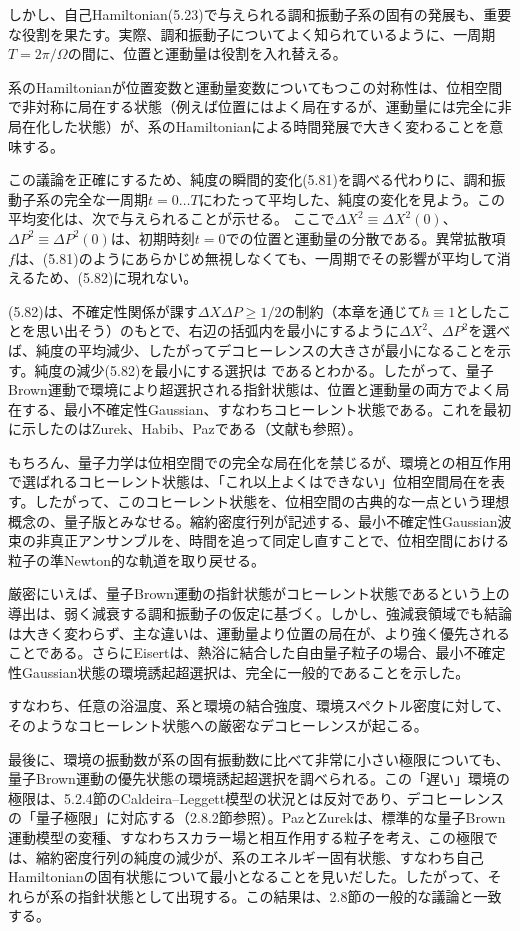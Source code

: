 しかし、自己Hamiltonian(5.23)で与えられる調和振動子系の固有の発展も、重要な役割を果たす。実際、調和振動子についてよく知られているように、一周期$T=2\pi/\Omega$の間に、位置と運動量は役割を入れ替える。

\hypertarget{srcpage:202}{}\label{srcpage:202}
系のHamiltonianが位置変数と運動量変数についてもつこの対称性は、位相空間で非対称に局在する状態（例えば位置にはよく局在するが、運動量には完全に非局在化した状態）が、系のHamiltonianによる時間発展で大きく変わることを意味する。

この議論を正確にするため、純度の瞬間的変化(5.81)を調べる代わりに、調和振動子系の完全な一周期$t=0\ldots T$にわたって平均した、純度の変化を見よう。この平均変化は、次で与えられることが示せる\cite{ref015,ref084}。
ここで$\Delta X^2\equiv\Delta X^2(0)$、$\Delta P^2\equiv\Delta P^2(0)$は、初期時刻$t=0$での位置と運動量の分散である。異常拡散項$f$は、(5.81)のようにあらかじめ無視しなくても、一周期でその影響が平均して消えるため、(5.82)に現れない。

(5.82)は、不確定性関係が課す$\Delta X\Delta P\geq1/2$の制約（本章を通じて$\hbar\equiv1$としたことを思い出そう）のもとで、右辺の括弧内を最小にするように$\Delta X^2$、$\Delta P^2$を選べば、純度の平均減少、したがってデコヒーレンスの大きさが最小になることを示す。純度の減少(5.82)を最小にする選択は
であるとわかる。したがって、量子Brown運動で環境により超選択される指針状態は、位置と運動量の両方でよく局在する、最小不確定性Gaussian、すなわちコヒーレント状態である。これを最初に示したのはZurek、Habib、Paz\cite{ref086}である（文献\cite{ref084,ref223,ref224,ref225,ref226}も参照）。

もちろん、量子力学は位相空間での完全な局在化を禁じるが、環境との相互作用で選ばれるコヒーレント状態は、「これ以上よくはできない」位相空間局在を表す。したがって、このコヒーレント状態を、位相空間の古典的な一点という理想概念の、量子版とみなせる。縮約密度行列が記述する、最小不確定性Gaussian波束の非真正アンサンブルを、時間を追って同定し直すことで、位相空間における粒子の準Newton的な軌道を取り戻せる。

厳密にいえば、量子Brown運動の指針状態がコヒーレント状態であるという上の導出は、弱く減衰する調和振動子の仮定に基づく。しかし、強減衰領域でも結論は大きく変わらず、主な違いは、運動量より位置の局在が、より強く優先されることである\cite{ref227}。さらにEisert\cite{ref106}は、熱浴に結合した自由量子粒子の場合、最小不確定性Gaussian状態の環境誘起超選択は、完全に一般的であることを示した。

\hypertarget{srcpage:203}{}\label{srcpage:203}
すなわち、任意の浴温度、系と環境の結合強度、環境スペクトル密度に対して、そのようなコヒーレント状態への厳密なデコヒーレンスが起こる。

最後に、環境の振動数が系の固有振動数に比べて非常に小さい極限についても、量子Brown運動の優先状態の環境誘起超選択を調べられる。この「遅い」環境の極限は、5.2.4節のCaldeira--Leggett模型の状況とは反対であり、デコヒーレンスの「量子極限」に対応する（2.8.2節参照）。PazとZurek\cite{ref103}は、標準的な量子Brown運動模型の変種、すなわちスカラー場と相互作用する粒子を考え、この極限では、縮約密度行列の純度の減少が、系のエネルギー固有状態、すなわち自己Hamiltonianの固有状態について最小となることを見いだした。したがって、それらが系の指針状態として出現する。この結果は、2.8節の一般的な議論と一致する。
